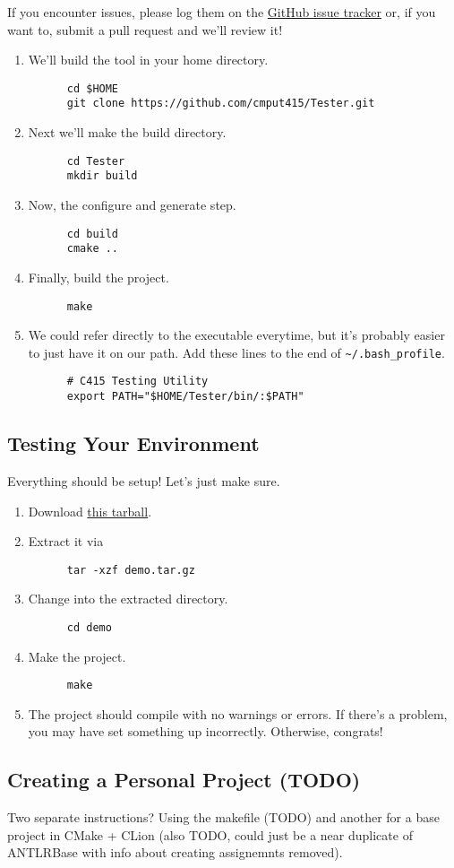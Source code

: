 \documentclass[../setup.tex]{subfiles}
\begin{document}
If you encounter issues, please log them on the \href{https://github.com/cmput415/Tester/issues}
{GitHub issue tracker} or, if you want to, submit a pull request and we'll review it!
\begin{enumerate}
  \item
    We'll build the tool in your home directory.
    \begin{lstlisting}
      cd $HOME
      git clone https://github.com/cmput415/Tester.git
    \end{lstlisting}
  \item
    Next we'll make the build directory.
    \begin{lstlisting}
      cd Tester
      mkdir build
    \end{lstlisting}
  \item
    Now, the configure and generate step.
    \begin{lstlisting}
      cd build
      cmake ..
    \end{lstlisting}
  \item
    Finally, build the project.
    \begin{lstlisting}
      make
    \end{lstlisting}
  \item
    We could refer directly to the executable everytime, but it's probably easier to just have it
    on our path. Add these lines to the end of \lstinline{~/.bash_profile}.
    \begin{lstlisting}
      # C415 Testing Utility
      export PATH="$HOME/Tester/bin/:$PATH"
    \end{lstlisting}
\end{enumerate}

\subsection{Testing Your Environment}
Everything should be setup! Let's just make sure.
\begin{enumerate}
  \item
    Download \href{https://webdocs.cs.ualberta.ca/\%7Ec415/setup/static/demo.tar.gz} {this
    tarball}.
  \item
    Extract it via
    \begin{lstlisting}
      tar -xzf demo.tar.gz
    \end{lstlisting}
  \item
    Change into the extracted directory.
    \begin{lstlisting}
      cd demo
    \end{lstlisting}
  \item
    Make the project.
    \begin{lstlisting}
      make
    \end{lstlisting}
  \item
    The project should compile with no warnings or errors. If there's a problem, you may have set
    something up incorrectly. Otherwise, congrats!
\end{enumerate}

\subsection{Creating a Personal Project (TODO)}
Two separate instructions? Using the makefile (TODO) and another for a base project in CMake +
CLion (also TODO, could just be a near duplicate of ANTLRBase with info about creating assignemnts
removed).
\end{document}
